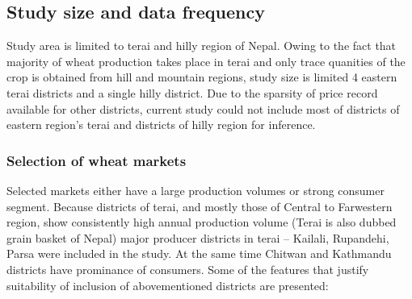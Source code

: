 \documentclass[12pt,]{article}
\begin{document}
\hypertarget{study-size-and-data-frequency}{%
\subsection{Study size and data frequency}\label{study-size-and-data-frequency}}

Study area is limited to terai and hilly region of Nepal. Owing to the fact that majority of wheat production takes place in terai and only trace quanities of the crop is obtained from hill and mountain regions, study size is limited 4 eastern terai districts and a single hilly district. Due to the sparsity of price record available for other districts, current study could not include most of districts of eastern region's terai and districts of hilly region for inference.

\hypertarget{selection-of-wheat-markets}{%
\subsubsection{Selection of wheat markets}\label{selection-of-wheat-markets}}

Selected markets either have a large production volumes or strong consumer segment. Because districts of terai, and mostly those of Central to Farwestern region, show consistently high annual production volume (Terai is also dubbed grain basket of Nepal) major producer districts in terai -- Kailali, Rupandehi, Parsa were included in the study. At the same time Chitwan and Kathmandu districts have prominance of consumers. Some of the features that justify suitability of inclusion of abovementioned districts are presented:
\end{document}
